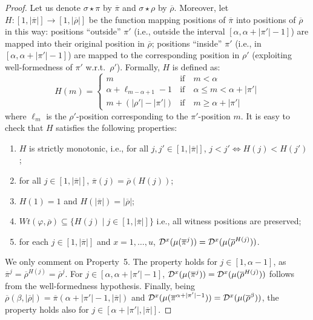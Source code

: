 \begin{proof}
Let us denote $\sigma\star\pi$ by $\overline{\pi}$ and $\sigma\star\rho$ by $\overline{\rho}$. Moreover,
let $H:[1,|\overline{\pi}|] \rightarrow [1,|\overline{\rho}|]$ be the function mapping positions of $\overline{\pi}$ into positions of $\overline{\rho}$ in this way: positions ``outside'' $\pi'$ (i.e., outside the interval $[\alpha,\alpha+|\pi'|-1]$) are mapped into their original position in $\overline{\rho}$; positions ``inside'' $\pi'$ (i.e., in $[\alpha,\alpha+|\pi'|-1]$) are mapped to the corresponding position in 
$\rho'$ (exploiting well-formedness of $\pi'$ w.r.t.\ $\rho'$). Formally,  $H$ is defined as:
%
\begin{equation*}\label{equation:H}
H(m) = \begin{cases}  
	m& \text{if}\quad m<\alpha \\
\alpha+\ell_{m-\alpha+1}-1 & \mbox{if}\quad \alpha\leq m<\alpha+|\pi'| \\
m+(|\rho'| - |\pi'|) & \mbox{if}\quad m\geq \alpha+|\pi'|
\end{cases}
\end{equation*}
where  $\ell_m$ is the $\rho'$-position corresponding to the $\pi'$-position $m$.
%
It is easy to check that $H$ satisfies the following properties: 
\begin{enumerate}
    \item $H$ is strictly monotonic, i.e., for all $j,j'\in [1,|\overline{\pi}|]$, $j<j'\iff H(j)<H(j')$;
    \item for all $j\in [1,|\overline{\pi}|]$, $\overline{\pi}(j) = \overline{\rho}(H(j))$;
    \item $H(1)= 1$ and $H(|\overline{\pi}|)=|\overline{\rho}|$;
    \item $Wt(\varphi, \overline{\rho}) \subseteq \{H(j) \mid j \in [1,|\overline{\pi}|] \}$  i.e., all witness positions are preserved;
    \item for each $j\in [1,|\overline{\pi}|]$ and $x=1,\ldots , u$, $\mathcal{D}^x(\mu(\overline{\pi}^{j}))=\mathcal{D}^x(\mu(\overline{\rho}^{H(j)}))$.
\end{enumerate}
We only comment on Property~5.
The property holds for $j\in [1,\alpha-1]$, as $\overline{\pi}^j=\overline{\rho}^{H(j)}=\overline{\rho}^j$. 
For $j\in [\alpha,\alpha+|\pi'|-1]$, $\mathcal{D}^x(\mu(\overline{\pi}^j))=\mathcal{D}^x(\mu(\overline{\rho}^{H(j)}))$ follows from the well-formedness hypothesis.
Finally, being $\overline{\rho}(\beta,|\overline{\rho}|)=\overline{\pi}(\alpha+|\pi'|-1,|\overline{\pi}|)$ and $\mathcal{D}^x(\mu(\overline{\pi}^{\alpha+|\pi'|-1}))=\mathcal{D}^x(\mu(\overline{\rho}^\beta))$, the property holds also for $j\in [\alpha+|\pi'|,|\overline{\pi}|]$.


\end{proof}
